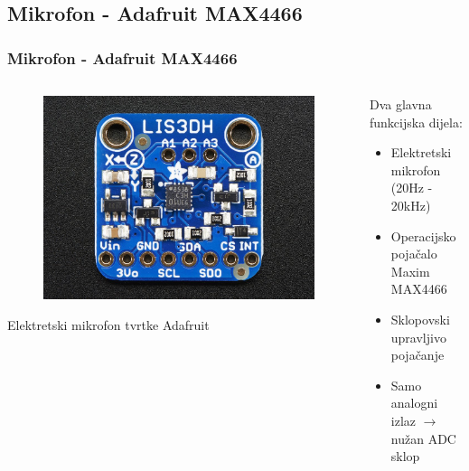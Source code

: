 \documentclass[12pt]{beamer}
\begin{document}
\subsection{Mikrofon - Adafruit MAX4466}
\begin{frame}
	\frametitle{Mikrofon - Adafruit MAX4466}
	\begin{columns}[T]
	    \begin{column}{.5\textwidth}
		\begin{figure}[h]
			\begin{minipage}{\textwidth}
				\centering
				\includegraphics[width=\linewidth]{slike/lis3dh.jpg}
			\end{minipage}
		\end{figure}
		Elektretski mikrofon tvrtke Adafruit
		\end{column}

		\begin{column}{.5\textwidth}
			Dva glavna funkcijska dijela:
			\begin{itemize}
				\item Elektretski mikrofon (20Hz - 20kHz)
				\item Operacijsko pojačalo Maxim MAX4466
			\end{itemize}
			\begin{itemize}
				\item Sklopovski upravljivo pojačanje
				\item Samo analogni izlaz $\longrightarrow$ nužan ADC sklop
			\end{itemize}
		\end{column}
	\end{columns}
\end{frame}
\end{document}

